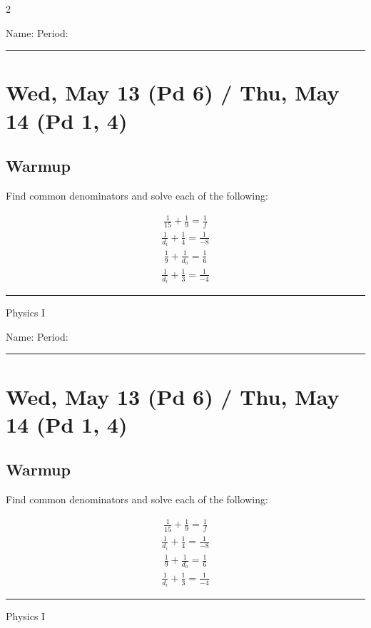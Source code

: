 \documentclass[10pt,landscape]{exam}
\def\todayDate{Wed, May 13 (Pd 6) / Thu, May 14 (Pd 1, 4)}
\def\content{
Find common denominators and solve each of the following:

\begin{questions}
  \question
    \begin{align*}
      \frac{1}{15} + \frac{1}{9} = \frac{1}{f}
    \end{align*}
    \vfill
  \question
    \begin{align*}
      \frac{1}{d_i} + \frac{1}{4} = \frac{1}{-8}
   \end{align*}
    \vfill
  \question
    \begin{align*}
      \frac{1}{9} + \frac{1}{d_o} = \frac{1}{6}
    \end{align*}
    \vfill
  \question
    \begin{align*}
      \frac{1}{d_i} + \frac{1}{3} = \frac{1}{-4}
    \end{align*}
    \vfill
\end{questions}
}
\begin{document}
\pagestyle{empty}

\setlength{\columnsep}{0.8in}
\begin{multicols*}{2}

\noindent  
Name: \hfill Period: \hspace{5em}
\vspace{0.5em}
\hrule

\section*{\todayDate}
\subsection*{Warmup}

\content

\vfill
\hrule
\vspace{0.5em}
\hfill {\sc Physics I}

\columnbreak

\noindent  
Name: \hfill Period: \hspace{5em}
\vspace{0.5em}
\hrule

\section*{\todayDate}
\subsection*{Warmup}

\content

\vfill
\hrule
\vspace{0.5em}
\hfill {\sc Physics I}

\end{multicols*}
\end{document}
